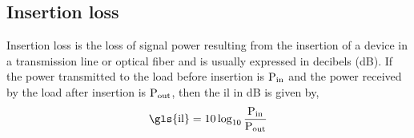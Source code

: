 \documentclass[../report.tex]{subfiles}
\begin{document}
\subsection{Insertion loss}
Insertion loss is the loss of signal power resulting from the insertion of a device in a transmission line or optical fiber and is usually expressed in decibels (dB). If the power transmitted to the load before insertion is $\mathrm{P_{in}}$ and the power received by the load after insertion is $\mathrm{P_{out}}$, then the \gls{il} in dB is given by,
\begin{equation}\label{eq:insertion_loss}
\text{\gls{il}} = 10\log _{10} \dfrac {\mathrm{P_{in}}} {\mathrm{P_{out}}}
\end{equation}
\end{document}
